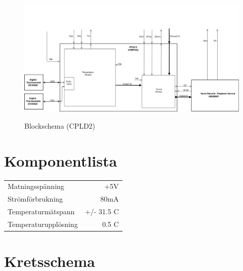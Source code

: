 \documentclass[a4paper,11pt]{article}
\begin{document}
		\begin{figure}[ht!]
		  \centering
		      \includegraphics[scale=0.48, angle=90]{BlockDiagramCPLD2.png}
			\label{fig:BlockDiagram2}
		  	\caption{Blockschema (CPLD2)}
		\end{figure}

	\section{Komponentlista}

		\begin{tabular}{ l r}
		   	Matningsspänning & +5V\\
		   	Strömförbrukning & ~80mA\\
		   	Temperaturmätspann & +/- 31.5 C\\
			Temperaturupplösning & 0.5 C\\	
		\end{tabular}

	\section{Kretsschema}
\end{document}
